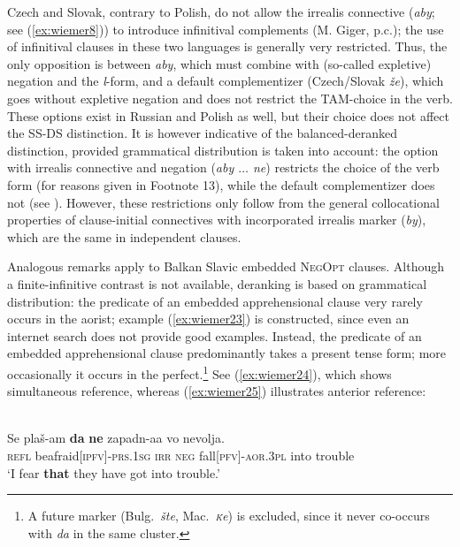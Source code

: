 \documentclass[output=paper,colorlinks,citecolor=brown]{langscibook}
\begin{document}
 Czech and Slovak, contrary to Polish, do not allow the irrealis connective (\textit{aby}; see (\ref{ex:wiemer8})) to introduce infinitival complements (M. Giger, p.c.); the use of infinitival clauses in these two languages is generally very restricted. Thus, the only opposition is between \textit{aby}, which must combine with (so-called expletive) negation and the \textit{l}-form, and a default complementizer (Czech/Slovak \textit{že}), which goes without expletive negation and does not restrict the TAM-choice in the verb. These options exist in Russian and Polish as well, but their choice does not affect the SS-DS distinction. It is however indicative of the balanced-deranked distinction, provided grammatical distribution is taken into account: the option with irrealis connective and negation (\textit{aby $\ldots$ ne}) restricts the choice of the verb form (for reasons given in Footnote 13), while the default complementizer does not (see ). However, these restrictions only follow from the general collocational properties of clause-initial connectives with incorporated irrealis marker (\textit{by}), which are the same in independent clauses.


Analogous remarks apply to Balkan Slavic embedded \textsc{NegOpt} clauses. Al\-though a finite-infinitive contrast is not available, deranking is based on grammatical distribution: the predicate of an embedded apprehensional clause very rarely occurs in the aorist; example (\ref{ex:wiemer23}) is constructed, since even an internet search does not provide good examples. Instead, the predicate of an embedded apprehensional clause predominantly takes a present tense form; more occasionally it occurs in the perfect.\footnote{A future marker (Bulg.\ \textit{šte}, Mac.\ \textit{\textsc{\'k}e}) is excluded, since it never co-occurs with \textit{da} in the same cluster.} See (\ref{ex:wiemer24}), which shows simultaneous reference, whereas (\ref{ex:wiemer25}) illustrates anterior reference:


\ea
\label{ex:wiemer23} 
 \\
\gll Se plaš-am \textbf{da} \textbf{ne} zapadn-aa vo nevolja. \\
\textsc{refl} be\textunderscore afraid\textsc{[ipfv]-prs.1sg} \textsc{irr} \textsc{neg} fall\textsc{[pfv]-aor.3pl} into trouble \\
\glt `I fear \textbf{that} they have got into trouble.' \\
\z
\end{document}
